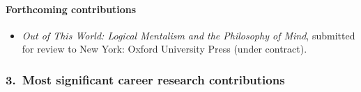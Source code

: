 \documentclass[12pt]{article}
\begin{document}
\begin{itemize}
	
	
	
	


	
	

\end{itemize}


\paragraph{Forthcoming contributions}
\begin{itemize}
	\item[] \emph{Out of This World: Logical Mentalism and the Philosophy of Mind}, submitted for review to New York: Oxford University Press (under contract).
	

\end{itemize}



\subsubsection*{3.\ \quad Most significant career research contributions}
\end{document}
